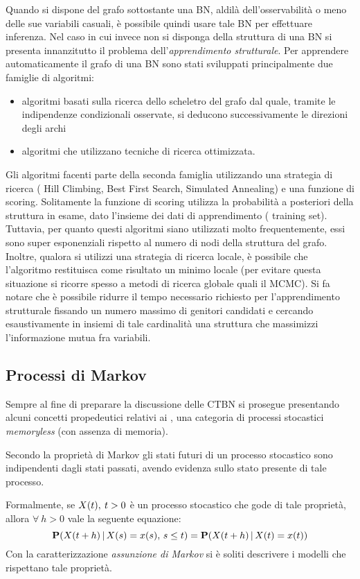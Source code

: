 Quando si dispone del grafo sottostante una \acs{BN}, aldilà dell'osservabilità o meno delle sue variabili casuali, è possibile quindi usare tale \acs{BN} per effettuare inferenza. Nel caso in cui invece non si disponga della struttura di una \acs{BN} si presenta innanzitutto il problema dell'\emph{apprendimento strutturale}. Per apprendere automaticamente il grafo di una \acl{BN} sono stati sviluppati principalmente due famiglie di algoritmi:
\begin{itemize}
    \item algoritmi basati sulla ricerca dello scheletro del grafo dal quale, tramite le indipendenze condizionali osservate, si deducono successivamente le direzioni degli archi
    \item algoritmi che utilizzano tecniche di ricerca ottimizzata.
\end{itemize}
Gli algoritmi facenti parte della seconda famiglia utilizzando una strategia di ricerca (\eg{} Hill Climbing, Best First Search, Simulated Annealing) e una funzione di scoring. Solitamente la funzione di scoring utilizza la probabilità a posteriori della struttura in esame, dato l'insieme dei dati di apprendimento (\ie{} training set). Tuttavia, per quanto questi algoritmi siano utilizzati molto frequentemente, essi sono super esponenziali rispetto al numero di nodi della struttura del grafo. Inoltre, qualora si utilizzi una strategia di ricerca locale, è possibile che l'algoritmo restituisca come risultato un minimo locale (per evitare questa situazione si ricorre spesso a metodi di ricerca globale quali il \acs{MCMC}). Si fa notare che è possibile ridurre il tempo necessario richiesto per l'apprendimento strutturale fissando un numero massimo di genitori candidati e cercando esaustivamente in insiemi di tale cardinalità una struttura che massimizzi l'informazione mutua fra variabili.

\subsection{Processi di Markov}
\label{sec:mps}

Sempre al fine di preparare la discussione delle \acl{CTBN} si prosegue presentando alcuni concetti propedeutici relativi ai \mprocess{}, una categoria di processi stocastici \emph{memoryless} (con assenza di memoria).

\begin{definizione}
\label{defn:markov-assumption}
Secondo la proprietà di Markov gli stati futuri di un processo stocastico sono indipendenti dagli stati passati, avendo evidenza sullo stato presente di tale processo.

Formalmente, se $\mathnormal{X}(t),\:t > 0$ è un processo stocastico che gode di tale proprietà, allora $\forall\:h > 0$ vale la seguente equazione:
\begin{equation}
\label{eq:markov-assumption}
\mathbf{P}(\mathnormal{X}(t + h)\,\arrowvert\,\mathnormal{X}(s)=x(s),\,s\leq t)=\mathbf{P}(\mathnormal{X}(t + h)\,\arrowvert\,\mathnormal{X}(t)=x(t))
\end{equation}
Con la caratterizzazione \emph{assunzione di Markov} si è soliti descrivere i modelli che rispettano tale proprietà.
\end{definizione}

